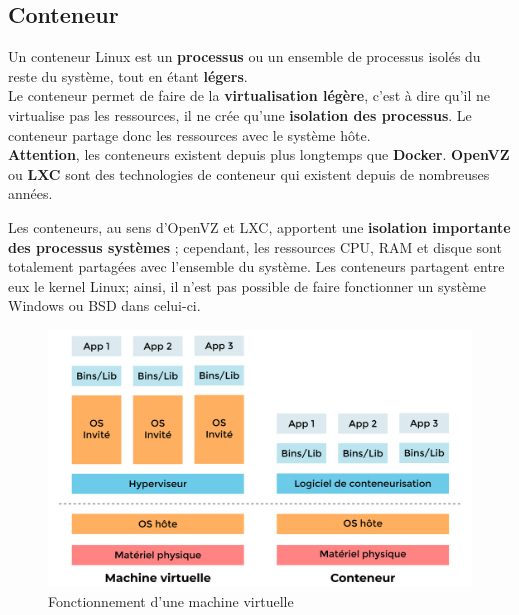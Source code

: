 \documentclass[12pt,a4paper]{article}
\begin{document}
\subsection{Conteneur}
Un conteneur Linux est un \textbf{processus} ou un ensemble de processus isolés du reste du
système, tout en étant \textbf{légers}.\\
Le conteneur permet de faire de la \textbf{virtualisation légère}, c'est à dire qu'il ne virtualise pas les ressources, il ne crée qu'une \textbf{isolation des processus}. Le conteneur partage donc les ressources avec le système hôte.\\

\textbf{Attention}, les conteneurs existent depuis plus longtemps que \textbf{Docker}.
\textbf{OpenVZ} ou \textbf{LXC} sont des technologies de conteneur qui existent depuis de
nombreuses années.

Les conteneurs, au sens d'OpenVZ et LXC, apportent une \textbf{isolation importante des processus systèmes} ; cependant, les ressources CPU, RAM et disque sont totalement
partagées avec l'ensemble du système. Les conteneurs partagent entre eux le kernel Linux;
ainsi, il n'est pas possible de faire fonctionner un système Windows ou BSD dans celui-ci.

\begin{figure}[!t]
\centering
\includegraphics[scale=0.3]{img/container_vs_vm.png}
\caption{Fonctionnement d'une machine virtuelle}
\label{Tux}
\end{figure}
\end{document}
